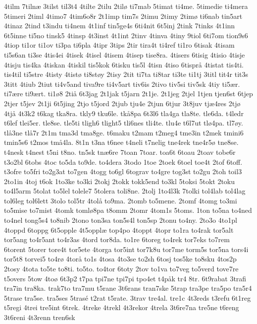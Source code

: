 {4tilm
7tilnæ
3tilst
til3t4
4tilte
2tilu
2tilø
ti7mab
5timat
ti4me.
5timedie
ti4mera
5timeri
2timl
4timo7
4tim6o8r
2t1imp
tim7s
2timu
2timy
2timø
ti6nab
tin5art
4tinaz
2tind
t3indu
ti4nem
4t1inf
tin5ge4s
6ti4nit
6t5inj
2tink
7tinks
4t1inn
6t5inne
ti5no
tinsk5
4tinsp
4t3inst
4t1int
2tinv
4tinva
4tiny
9tiol
6ti7om
tion9s6
4tiop
ti1or
ti1ov
ti3pa
ti6pla
4tipr
3tips
2tir
tira4t
ti4ref
ti1ro
6tisak
4tisam
ti5s6an
ti3se
4tis4ei
4tisek
4tisel
4tisem
4tisep
tise8ra.
4tisers
6tisig
4tisio
4tisje
4tisju
tis4ka
4tiskan
4tiskil
tis5kok
6tisku
tis5l
4tisn
4tiso
6tisprå
4tistat
tis4ti.
tis4til
ti5stre
4tisty
4tistø
ti8støy
2tisy
2tit
ti7ta
ti8tar
ti3te
ti1tj
3titl
tit4r
tit3s
3titt
4tiub
2tiut
ti4v5and
tiva9re
ti4v5art
tiv6is
2tivo
tiv5si
tiv5sk
4tiy
ti5ær.
ti7ære
ti9ært.
ti1ø8
2tiå
6t3jag
2t1jak
t5jarn
2t1je.
2t1jeg
2tjel
1tjen
tjen6st
6tjep
2tjer
t5jev
2t1ji
6t5jing
2tjo
t5jord
2tjub
tju4e
2tjun
6tjur
3t8juv
tjæ4res
2tjø
4tjå
4t3k2
t6kag
tka8ra.
tkly9
tku6le.
tkå8pa
6t3l6
tla4ga
tla8te.
tle6da.
t4ledr
t6lef
tlei5er.
tle8se.
tle5ti
tligh6
tlight5
tli6nes
tli4te.
tlu4e
t6l7ut
tlø4pa.
tl7øy.
tlå3ne
tlå7r
2t1m
tma3d
tma8ge.
t6maku
t2mam
t2meg4
tme3in
t2mek
tmini6
tmin5s6
t2mos
tmå4la.
8t1n
t3na
t6nee
t4neli
t7nelig
tne4rek
tne4r5ø
tne8se.
t4nesk
t4nest
t5ni
t8no.
tn5sk
tnæ6re
7toan
7toar.
toa6t
6toau
2toav
tobe6r
t3o2bl
6tobs
4toc
to5da
to9de.
to4dera
3todo
1toe
2toek
6toel
toe4t
2tof
6toff.
t3ofre
to5fri
to2g3at
to7gen
4togg
to6gl
6tograv
to4gre
tog3st
to2gu
2toh
toil3
2to1in
4toj
t6ok
1to3ke
to3ki
2tokj
2tokk
tokk5end
to3kl
5toksi
5tokt
2toku
to4l5arm
5tolat
to5lel
tolele7
5tolera
toli8ne.
2tolj
1to4l3k
7tolki
tol4lab
tol4lag
tol6leg
tol6lett
3tolo
tol5tr
4tolå
to9ma.
2tomb
to5mene.
2tomf
4tomg
to3mi
to5mise
to7mist
4tomk
tomlø8pa
t8omm
2tomr
4tom1s
5toms.
1ton
to5na
to4ned
to4nel
tong5s4
to8nib
2tono
ton3sa
ton5s4l
ton5sp
2tonu
to4ny.
2to3o
4to1pl
4toppd
6toppg
6t5opple
4t5opplæ
top4po
4toppt
4topr
to1ra
to4rak
tor5alt
tor5ang
to4r5ant
to4r3as
4tord
tor8da.
to1re
6toreg
to4rek
tor7eks
to7rem
6torent
5torer
tore4t
tor5ete
4torga
tor5int
tor7k8u
tor7me
torm5s
tor5na
tors4i
tor5t8
torvei5
to4rø
4torå
to1s
4tosa
4to3se
to2sh
6tosj
tos5ke
to8sku
4tos2p
2tosy
4tota
to5te
to8ti.
to5to.
to4tor
6toty
2tov
to1va
to7veg
to5verd
tove7re
t5overs
5tow
4toø
6t3p2
t7pa
tpi7ne
tpi7pi
tpo4et
t4påk
tr4
8tr.
6t9rabat
3trafi
tra7in
tra8ka.
trak7to
tra7mu
t5rane
3t6rans
tran7ske
5trap
tra3pe
tra5po
tra5r4
5trase
tra5se.
tra5ses
5trasé
t2rat
t5rate.
3trav
tre4al.
tre1c
4t3reds
t3refu
6t1reg
t5regi
4trei
tre5int
6trek.
4treke
4trekl
4t3rekor
4trela
3t6re7na
tre5ne
t6reng
3t6reni
4t3renn
tren6sk
}
